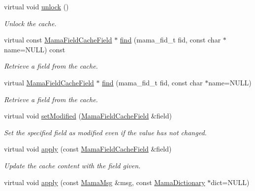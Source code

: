 \begin{DoxyCompactItemize}
virtual void \hyperlink{classWombat_1_1MamaFieldCache_ad893a423af9d5b07eb6f27ad482885d7}{unlock} ()
\begin{DoxyCompactList}\small\item\em Unlock the cache. \item\end{DoxyCompactList}\item 
virtual const \hyperlink{classWombat_1_1MamaFieldCacheField}{MamaFieldCacheField} $\ast$ \hyperlink{classWombat_1_1MamaFieldCache_af8011dde43b855c372cb734f69a77025}{find} (mama\_\-fid\_\-t fid, const char $\ast$name=NULL) const 
\begin{DoxyCompactList}\small\item\em Retrieve a field from the cache. \item\end{DoxyCompactList}\item 
virtual \hyperlink{classWombat_1_1MamaFieldCacheField}{MamaFieldCacheField} $\ast$ \hyperlink{classWombat_1_1MamaFieldCache_a7fd0b10e6ba432be77cb2b0e4623831e}{find} (mama\_\-fid\_\-t fid, const char $\ast$name=NULL)
\begin{DoxyCompactList}\small\item\em Retrieve a field from the cache. \item\end{DoxyCompactList}\item 
virtual void \hyperlink{classWombat_1_1MamaFieldCache_a39d894aad55e8fc21cd00f766d9a4b48}{setModified} (\hyperlink{classWombat_1_1MamaFieldCacheField}{MamaFieldCacheField} \&field)
\begin{DoxyCompactList}\small\item\em Set the specified field as modified even if the value has not changed. \item\end{DoxyCompactList}\item 
virtual void \hyperlink{classWombat_1_1MamaFieldCache_ab0e54b7daa08ea7f93ec5bb7ca2327e0}{apply} (const \hyperlink{classWombat_1_1MamaFieldCacheField}{MamaFieldCacheField} \&field)
\begin{DoxyCompactList}\small\item\em Update the cache content with the field given. \item\end{DoxyCompactList}\item 
virtual void \hyperlink{classWombat_1_1MamaFieldCache_ac28a7674251608149028785424130160}{apply} (const \hyperlink{classWombat_1_1MamaMsg}{MamaMsg} \&msg, const \hyperlink{classWombat_1_1MamaDictionary}{MamaDictionary} $\ast$dict=NULL)

\end{DoxyCompactItemize}
